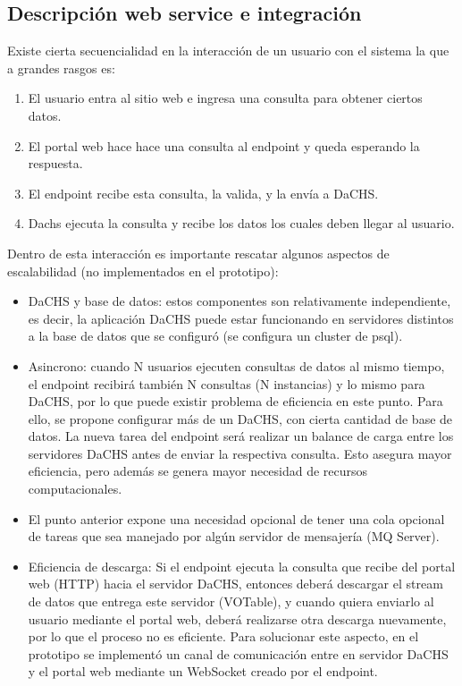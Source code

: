 \subsection{Descripción web service e integración}
Existe cierta secuencialidad en la interacción de un usuario con el sistema la que a grandes rasgos es:
\begin{enumerate}
	\item El usuario entra al sitio web e ingresa una consulta para obtener ciertos datos.
	\item El portal web hace hace una consulta al endpoint y queda esperando la respuesta.
	\item El endpoint recibe esta consulta, la valida, y la envía a DaCHS.
	\item Dachs ejecuta la consulta y recibe los datos los cuales deben llegar al usuario.
\end{enumerate}

Dentro de esta interacción es importante rescatar algunos aspectos de
escalabilidad (no implementados en el prototipo):
\begin{itemize}
	\item DaCHS y base de datos: estos componentes son relativamente
independiente, es decir, la aplicación DaCHS puede estar funcionando en
servidores distintos a la base de datos que se configuró (se configura un
cluster de psql).
	\item Asincrono: cuando N usuarios ejecuten consultas de datos al mismo
tiempo, el endpoint recibirá también N consultas (N instancias) y lo mismo para
DaCHS, por lo que puede existir problema de eficiencia en este punto. Para
ello, se propone configurar más de un DaCHS, con cierta cantidad de base de
datos. La nueva tarea del endpoint será realizar un balance de carga entre los
servidores DaCHS antes de enviar la respectiva consulta. Esto asegura mayor
eficiencia, pero además se genera mayor necesidad de recursos computacionales.
	\item El punto anterior expone una necesidad opcional de tener una cola
opcional de tareas que sea manejado por algún servidor de mensajería (MQ
Server).
	\item Eficiencia de descarga: Si el endpoint ejecuta la consulta que recibe
del portal web (HTTP) hacia el servidor DaCHS, entonces deberá descargar el
stream de datos que entrega este servidor (VOTable), y cuando quiera enviarlo
al usuario mediante el portal web, deberá realizarse otra descarga nuevamente,
por lo que el proceso no es eficiente. Para solucionar este aspecto, en el
prototipo se implementó un canal de comunicación entre en servidor DaCHS y el
portal web mediante un WebSocket creado por el endpoint. 
\end{itemize}

